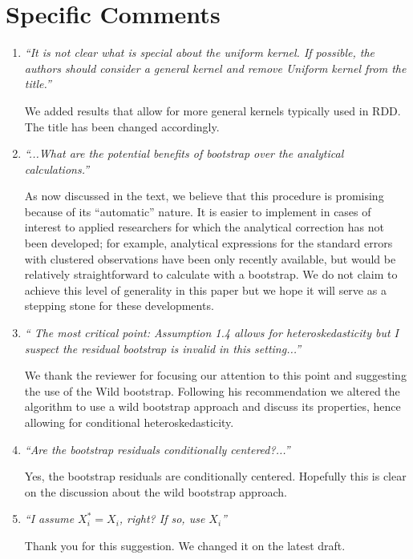 \documentclass[12pt,fleqn]{article}
\begin{document}
\section{Specific Comments}

\begin{enumerate}
 \item  \textit{``It is not clear what is special about the uniform kernel. If possible, the authors should consider a general kernel and remove Uniform kernel from the title.''}

 We added results that allow for more general kernels typically used in RDD. The title has been changed accordingly.

\item \textit{``...What are the potential benefits of bootstrap over the analytical calculations.''}

  As now discussed in the text, we believe that this procedure is promising
  because of its ``automatic'' nature. It is easier to implement in cases of
  interest to applied researchers for which the analytical correction has not
  been developed; for example, analytical expressions for the standard errors
  with clustered observations have been only recently available, but would be
  relatively straightforward to calculate with a bootstrap.  We do not claim to
  achieve this level of generality in this paper but we hope it will serve as a
  stepping stone for these developments.

\item \textit{`` The most critical point: Assumption 1.4 allows for heteroskedasticity but I suspect the residual bootstrap is invalid in this setting...''}

 We thank the reviewer for focusing our attention to this point and suggesting the use of the Wild bootstrap. Following his recommendation we altered the algorithm to use a wild bootstrap approach and discuss its properties, hence allowing for conditional heteroskedasticity.

\item \textit{``Are the bootstrap residuals conditionally centered?...''}

 Yes, the bootstrap residuals are conditionally centered. Hopefully this is clear on the discussion about the wild bootstrap approach.

\item \textit{``I assume $X_{i}^{*}=X_{i}$, right? If so, use $X_{i}$''}

Thank you for this suggestion. We changed it on the latest draft.


\end{enumerate}
\end{document}
